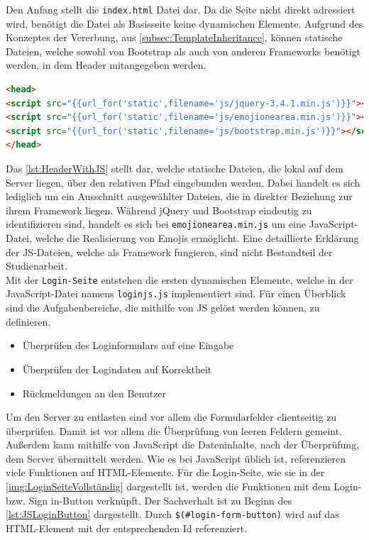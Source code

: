 \documentclass[a4paper,titlepage,halfparskip,12pt]{scrreprt}
\begin{document}
\begin{onehalfspacing}
Den Anfang stellt die \texttt{index.html} Datei dar. Da die Seite nicht direkt adressiert wird, benötigt die Datei als Basisseite keine dynamischen Elemente. Aufgrund des Konzeptes der Vererbung, aus \autoref{subsec:TemplateInheritance}, können statische Dateien, welche sowohl von Bootstrap als auch von anderen Frameworks benötigt werden, in dem Header mitangegeben werden. 
\begin{lstlisting}[language=HTML,caption=Listing der eingebundenen JS-Dateien im Header der index.html,label={lst:HeaderWithJS}]
<head>
<script src="{{url_for('static',filename='js/jquery-3.4.1.min.js')}}"></script>
<script src="{{url_for('static',filename='js/emojionearea.min.js')}}"></script>
<script src="{{url_for('static',filename='js/bootstrap.min.js')}}"></script>
</head>
\end{lstlisting}
Das \autoref{lst:HeaderWithJS} stellt dar, welche statische Dateien, die lokal auf dem Server liegen, über den relativen Pfad eingebunden werden. Dabei handelt es sich lediglich um ein Ausschnitt ausgewählter Dateien, die in direkter Beziehung zur ihrem Framework liegen. Während jQuery und Bootstrap eindeutig zu identifizieren sind, handelt es sich bei \texttt{emojionearea.min.js} um eine JavaScript-Datei, welche die Realisierung von Emojis ermöglicht. Eine detaillierte Erklärung der \ac{JS}-Dateien, welche als Framework fungieren, sind nicht Bestandteil der Studienarbeit.\\
Mit der \texttt{Login-Seite} entstehen die ersten dynamischen Elemente, welche in der JavaScript-Datei namens \texttt{loginjs.js} implementiert sind. Für einen Überblick sind die Aufgabenbereiche, die mithilfe von \ac{JS} gelöst werden können, zu definieren.
\begin{itemize}
	\item Überprüfen des Loginformulars auf eine Eingabe
	\item Überprüfen der Logindaten auf Korrektheit
	\item Rückmeldungen an den Benutzer
\end{itemize}
Um den Server zu entlasten sind vor allem die Formularfelder clientseitig zu überprüfen. Damit ist vor allem die Überprüfung von leeren Feldern gemeint. Außerdem kann mithilfe von JavaScript die Dateninhalte, nach der Überprüfung, dem Server übermittelt werden. Wie es bei JavaScript üblich ist, referenzieren viele Funktionen auf \ac{HTML}-Elemente. Für die Login-Seite, wie sie in der \autoref{img:LoginSeiteVollständig} dargestellt ist, werden die Funktionen mit dem Login- bzw. Sign in-Button verknüpft. Der Sachverhalt ist zu Beginn des \autoref{lst:JSLoginButton} dargestellt. Durch \texttt{\$(\#login-form-button)} wird auf das \ac{HTML}-Element mit der entsprechenden Id referenziert. 

\end{onehalfspacing}
\end{document}
